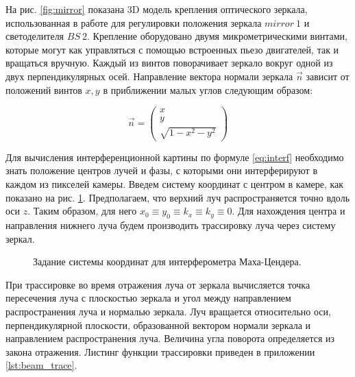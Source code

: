 На рис. \ref{fig:mirror} показана 3D модель крепления оптического зеркала, использованная в работе для регулировки положения зеркала $mirror\ 1$ и светоделителя $BS\ 2$. Крепление оборудовано двумя микрометрическими винтами, которые могут как управляться с помощью встроенных пьезо двигателей, так и вращаться вручную. Каждый из винтов поворачивает зеркало вокруг одной из двух перпендикулярных осей. Направление вектора нормали зеркала $\vec{n}$ зависит от положений винтов $x, y$ в приближении малых углов следующим образом: 

\begin{equation}
    \vec{n} = \begin{pmatrix}
        x\\ 
        y\\ 
        \sqrt{1 - x^2 - y^2}
    \end{pmatrix}
\end{equation}


Для вычисления интерференционной картины по формуле \eqref{eq:interf} необходимо знать положение центров лучей и фазы, с которыми они интерферируют в каждом из пикселей камеры. Введем систему координат с центром в камере, как показано на рис. \ref{fig:MZI_coordis}. Предполагаем, что верхний луч распространяется точно вдоль оси  $z$. Таким образом, для него $x_0\equiv y_0\equiv k_x\equiv k_y\equiv 0$. Для нахождения центра и направления нижнего луча будем производить трассировку  луча через систему зеркал. 

\begin{figure}[ht]
\caption{Задание системы координат для интерферометра Маха-Цендера.}
\label{fig:MZI_coordis}
\end{figure}

При трассировке во время отражения луча от зеркала вычисляется точка пересечения луча с плоскостью зеркала и угол между направлением распространения луча и нормалью зеркала. Луч вращается относительно оси, перпендикулярной плоскости, образованной вектором нормали зеркала и  направлением распространения луча. Величина угла поворота определяется из закона отражения. Листинг функции трассировки приведен в приложении \ref{lst:beam_trace}.


